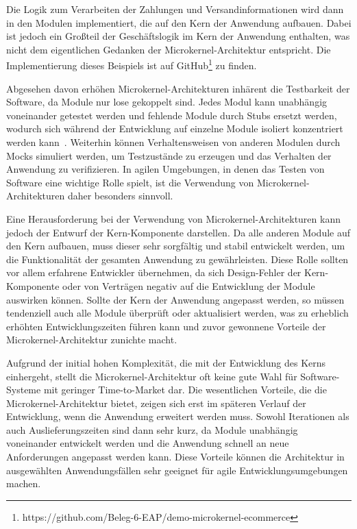 \documentclass[acmtog]{acmart}
\begin{document}
Die Logik zum Verarbeiten der Zahlungen und Versandinformationen wird dann in den Modulen implementiert, die auf den Kern der Anwendung aufbauen.
Dabei ist jedoch ein Großteil der Geschäftslogik im Kern der Anwendung enthalten, was nicht dem eigentlichen Gedanken der Microkernel-Architektur entspricht.
Die Implementierung dieses Beispiels ist auf GitHub\footnote{https://github.com/Beleg-6-EAP/demo-microkernel-ecommerce} zu finden.

Abgesehen davon erhöhen Microkernel-Architekturen inhärent die Testbarkeit der Software, da Module nur lose gekoppelt sind.
Jedes Modul kann unabhängig voneinander getestet werden und fehlende Module durch Stubs ersetzt werden, wodurch sich während der Entwicklung auf einzelne Module isoliert konzentriert werden kann~\cite[26]{architecturePatterns}.
Weiterhin können Verhaltensweisen von anderen Modulen durch Mocks simuliert werden, um Testzustände zu erzeugen und das Verhalten der Anwendung zu verifizieren.
In agilen Umgebungen, in denen das Testen von Software eine wichtige Rolle spielt, ist die Verwendung von Microkernel-Architekturen daher besonders sinnvoll.

Eine Herausforderung bei der Verwendung von Microkernel-Architekturen kann jedoch der Entwurf der Kern-Komponente darstellen.
Da alle anderen Module auf den Kern aufbauen, muss dieser sehr sorgfältig und stabil entwickelt werden, um die Funktionalität der gesamten Anwendung zu gewährleisten.
Diese Rolle sollten vor allem erfahrene Entwickler übernehmen, da sich Design-Fehler der Kern-Komponente oder von Verträgen negativ auf die Entwicklung der Module auswirken können.
Sollte der Kern der Anwendung angepasst werden, so müssen tendenziell auch alle Module überprüft oder aktualisiert werden, was zu erheblich erhöhten Entwicklungszeiten führen kann und zuvor gewonnene Vorteile der Microkernel-Architektur zunichte macht.

Aufgrund der initial hohen Komplexität, die mit der Entwicklung des Kerns einhergeht, stellt die Microkernel-Architektur oft keine gute Wahl für Software-Systeme mit geringer Time-to-Market dar.
Die wesentlichen Vorteile, die die Microkernel-Architektur bietet, zeigen sich erst im späteren Verlauf der Entwicklung, wenn die Anwendung erweitert werden muss.
Sowohl Iterationen als auch Auslieferungszeiten sind dann sehr kurz, da Module unabhängig voneinander entwickelt werden und die Anwendung schnell an neue Anforderungen angepasst werden kann.
Diese Vorteile können die Architektur in ausgewählten Anwendungsfällen sehr geeignet für agile Entwicklungsumgebungen machen.
\end{document}

